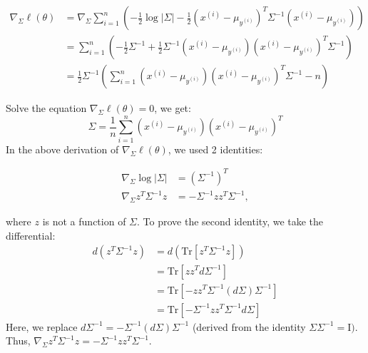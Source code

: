 \begin{answer}
\begin{align}
	\nabla_{\Sigma}\ell(\theta) 
	&= \nabla_{\Sigma} \sum \limits_{i = 1}^{n} \left(- \frac{1}{2}\log |\Sigma| - \frac{1}{2}(x^{(i)} - \mu_{y^{(i)}})^T \Sigma^{-1} (x^{(i)} - \mu_{y^{(i)}}) \right) \\
	&= \sum \limits_{i = 1}^{n} \left( -\frac{1}{2} \Sigma^{-1} + \frac{1}{2}  \Sigma^{-1} (x^{(i)} - \mu_{y^{(i)}}) (x^{(i)} - \mu_{y^{(i)}})^T \Sigma^{-1} \right) \\
	&= \frac{1}{2} \Sigma^{-1}\left( \sum \limits_{i = 1}^{n} (x^{(i)} - \mu_{y^{(i)}}) (x^{(i)} - \mu_{y^{(i)}})^T \Sigma^{-1} - n \right)
\end{align}

Solve the equation $\nabla_{\Sigma} \ell(\theta) = 0$, we get:
$$\widehat\Sigma = \frac{1}{n} \sum \limits_{i = 1}^{n} (x^{(i)} - \mu_{y^{(i)}}) (x^{(i)} - \mu_{y^{(i)}})^T$$
In the above derivation of $\nabla_{\Sigma} \ell(\theta)$, we used 2 identities:

\begin{align}
\nabla_{\Sigma}\log|\Sigma| &= (\Sigma^{-1})^T \\
\nabla_{\Sigma} z^T\Sigma^{-1} z &= -\Sigma^{-1} z z^T \Sigma^{-1}, 
\end{align}

where $z$ is not a function of $\Sigma$. To prove the second identity, we take the differential:
\begin{align}
	d(z^T \Sigma^{-1} z) 
	&= d(\text{Tr}[z^T \Sigma^{-1} z]) \\
	&= \text{Tr}[z z^T d\Sigma^{-1}] \\
	&= \text{Tr}[-z z^T \Sigma^{-1} (d\Sigma) \Sigma^{-1}] \\
	&= \text{Tr}[-\Sigma^{-1} z z^T \Sigma^{-1} d\Sigma]
\end{align}
Here, we replace $ d\Sigma^{-1} = -\Sigma^{-1}(d\Sigma)\Sigma^{-1} $ (derived from the identity $\Sigma \Sigma^{-1} = \text{I})$. Thus, $\nabla_{\Sigma} z^T\Sigma^{-1} z = -\Sigma^{-1} z z^T \Sigma^{-1}$. \\
\end{answer}
